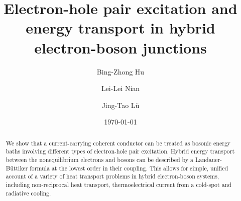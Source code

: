 \documentclass[aps
,twocolumn
,floatfix,footinbib,prl
]{revtex4-1}
\begin{document}

\title{Electron-hole pair excitation and energy transport in hybrid electron-boson junctions}
\author{Bing-Zhong Hu}
\author{Lei-Lei Nian}
\author{Jing-Tao L\"{u}}


\date{\today}%
\begin{abstract}

We show that a current-carrying coherent conductor can be treated as bosonic energy baths involving different types of electron-hole pair excitation. Hybrid energy transport between the nonequilibrium electrons and bosons can be described by a Landauer-B\"uttiker formula at the lowest order in their coupling. This allows for simple, unified account of a variety of heat transport problems in hybrid electron-boson systems, including non-reciprocal heat transport, thermoelectrical current from a cold-spot and radiative cooling.
\end{abstract}


\maketitle

\end{document}
